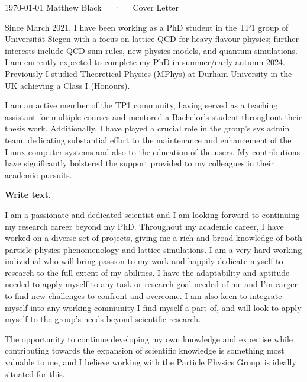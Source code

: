 \documentclass[11pt, a4paper]{awesome-cv}
\newcommand\research{Particle Physics Group}
\newcommand\uni{University of Washington}
\newcommand{\red}{\color{red}}
\begin{document}
\makecvheader[R]

\makecvfooter
  {\today}
  {Matthew Black~~~·~~~Cover Letter}
  {}

\makelettertitle

\begin{cvletter}

Since March 2021, I have been working as a PhD student in the TP1 group of Universit\"at Siegen with a focus on lattice QCD for heavy flavour physics; further interests include QCD sum rules, new physics models, and quantum simulations.
I am currently expected to complete my PhD in summer/early autumn 2024.
Previously I studied Theoretical Physics (MPhys) at Durham University in the UK achieving a Class I (Honours).

I am an active member of the TP1 community, having served as a teaching assistant for multiple courses and mentored a Bachelor's student throughout their thesis work. 
Additionally, I have played a crucial role in the group's sys admin team, dedicating substantial effort to the maintenance and enhancement of the Linux computer systems and also to the education of the users. 
My contributions have significantly bolstered the support provided to my colleagues in their academic pursuits.

\lettersection{Why \uni?}
{\red\bf Write text.}

I am a passionate and dedicated scientist and I am looking forward to continuing my research career beyond my PhD.
Throughout my academic career, I have worked on a diverse set of projects, giving me a rich and broad knowledge of both particle physics phenomenology and lattice simulations.
I am a very hard-working individual who will bring passion to my work and happily dedicate myself to research to the full extent of my abilities. 
I have the adaptability and aptitude needed to apply myself to any task or research goal needed of me and I'm earger to find new challenges to confront and overcome.
I am also keen to integrate myself into any working community I find myself a part of, and will look to apply myself to the group's needs beyond scientific research. 

The opportunity to continue developing my own knowledge and expertise while contributing towards the expansion of scientific knowledge is something most valuable to me, and I believe working with the \research~is ideally situated for this. 

\end{cvletter}

\makeletterclosing
\end{document}
